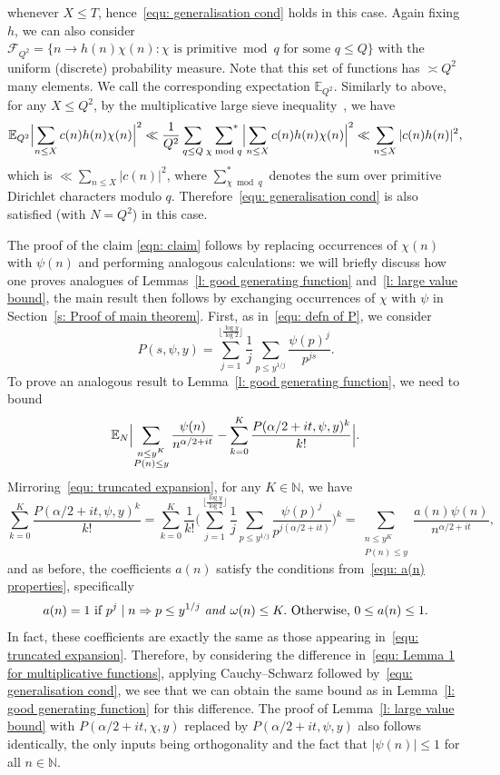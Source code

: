 \documentclass[a4paper,12pt,reqno]{amsart}
\newcommand{\N}{\mathbb{N}}
\newcommand{\E}{\mathbb{E}}
\begin{document}
whenever $X \leq T$, hence~\eqref{equ: generalisation cond} holds in this case. Again fixing $h$, we can also consider $\mathcal{F}_{Q^2} = \{ n \rightarrow h(n) \chi(n): \chi \text{ is primitive} \bmod q \text{ for some } q \leq Q \}$ with the uniform (discrete) probability measure. Note that this set of functions has $\asymp Q^2$ many elements. We call the corresponding expectation $\E_{Q^2}$. Similarly to above, for any $X \leq Q^2$, by the multiplicative large sieve inequality~\cite[Theorem~7.13]{IK}, we have 
\[
\E_{Q^2} \Bigl| \sum_{n \leq X} c(n) h(n) \chi(n) \Bigr|^2 \ll \frac{1}{Q^2} \sum_{q \leq Q} \, \, \sideset{}{^*} \sum_{\chi \bmod q} \Bigl| \sum_{n \leq X} c(n) h(n) \chi(n) \Bigr|^2 \ll \sum_{n \leq X} |c(n) h(n)|^2 ,
\]
which is $\ll \sum_{n \leq X} |c(n)|^2$, where $\sum\nolimits^{*}_{\chi \bmod q}$ denotes the sum over primitive Dirichlet characters modulo $q$. Therefore~\eqref{equ: generalisation cond} is also satisfied (with $N = Q^2$) in this case.

The proof of the claim \eqref{eqn: claim} follows by replacing occurrences of $\chi (n)$ with $\psi (n)$ and performing analogous calculations: we will briefly discuss how one proves analogues of Lemmas~\ref{l: good generating function} and~\ref{l: large value bound}, the main result then follows by exchanging occurrences of $\chi$ with $\psi$ in Section~\ref{s: Proof of main theorem}. First, as in~\eqref{equ: defn of P}, we consider
\[
P (s, \psi, y) = \sum_{j = 1}^{\lfloor \frac{\log y}{\log 2} \rfloor} \frac{1}{j} \sum_{p \leq y^{1/j}} \frac{\psi(p)^j}{p^{js}}.
\]
To prove an analogous result to Lemma~\ref{l: good generating function}, we need to bound
\begin{equation}\label{equ: Lemma 1 for multiplicative functions}
\E_{N} \Bigl| \sum_{\substack{n \leq y^K \\ P(n) \leq y}} \frac{\psi(n)}{n^{\alpha / 2 + it}} - \sum_{k = 0}^{K} \frac{P (\alpha / 2 + it, \psi, y)^{k}}{k!} \Bigr|.
\end{equation}
Mirroring~\eqref{equ: truncated expansion}, for any $K \in \N$, we have
\[
\sum_{k=0}^{K} \frac{P (\alpha/2 + it, \psi, y)^k}{k!} = \sum_{k=0}^{K} \frac{1}{k!} \biggl( \sum_{j = 1}^{\lfloor \frac{\log y}{\log 2} \rfloor} \frac{1}{j} \sum_{p \leq y^{1/j}} \frac{\psi (p)^j}{p^{j(\alpha / 2 + it)}} \biggr)^k = \sum_{\substack{n \leq y^K \\ P(n) \leq y}} \frac{a(n) \psi (n)}{n^{\alpha/2+it}},
\]
and as before, the coefficients $a(n)$ satisfy the conditions from~\eqref{equ: a(n) properties}, specifically
\[
a(n) = 1 \text{ if } p^j \mid n \Rightarrow p \leq y^{1/j} \text{ \emph{and} } \omega(n) \leq K. \text{ Otherwise, } 0 \leq a(n) \leq 1.
\]
In fact, these coefficients are exactly the same as those appearing in~\eqref{equ: truncated expansion}. Therefore, by considering the difference in~\eqref{equ: Lemma 1 for multiplicative functions}, applying Cauchy--Schwarz followed by~\eqref{equ: generalisation cond}, we see that we can obtain the same bound as in Lemma~\ref{l: good generating function} for this difference. The proof of Lemma~\ref{l: large value bound} with $P (\alpha/2+it, \chi, y)$ replaced by $P (\alpha/2+it, \psi, y)$ also follows identically, the only inputs being orthogonality and the fact that $|\psi (n)| \leq 1$ for all $n \in \N$.
\end{document}
